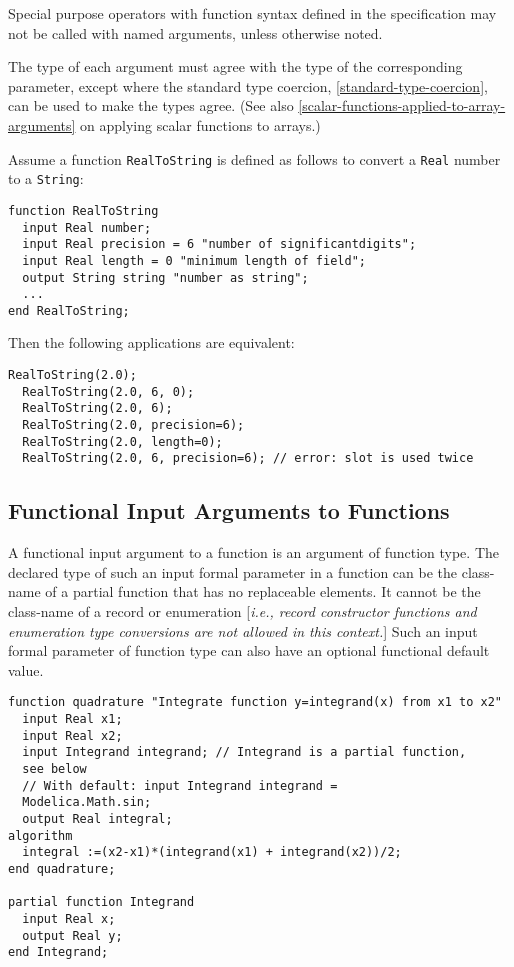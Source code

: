 Special purpose operators with function syntax defined in the
specification may not be called with named arguments, unless otherwise
noted.

The type of each argument must agree with the type of the corresponding
parameter, except where the standard type coercion, \autoref{standard-type-coercion}, can be used to make
the types agree. (See also \autoref{scalar-functions-applied-to-array-arguments} on applying scalar functions
to arrays.)

\begin{example}
Assume a function \lstinline!RealToString! is defined as follows to
convert a \lstinline!Real! number to a \lstinline!String!:
\begin{lstlisting}[language=modelica]
function RealToString
  input Real number;
  input Real precision = 6 "number of significantdigits";
  input Real length = 0 "minimum length of field";
  output String string "number as string";
  ...
end RealToString;
\end{lstlisting}
Then the following applications are equivalent:
\begin{lstlisting}[language=modelica]
  RealToString(2.0);
  RealToString(2.0, 6, 0);
  RealToString(2.0, 6);
  RealToString(2.0, precision=6);
  RealToString(2.0, length=0);
  RealToString(2.0, 6, precision=6); // error: slot is used twice
\end{lstlisting}
\end{example}

\subsection{Functional Input Arguments to Functions}

A functional input argument to a function is an argument of function
type. The declared type of such an input formal parameter in a function
can be the class-name of a partial function that has no replaceable
elements. It cannot be the class-name of a record or enumeration
{[}\emph{i.e., record constructor functions and enumeration type
conversions are not allowed in this context.}{]} Such an input formal
parameter of function type can also have an optional functional default
value.

\begin{example}
\begin{lstlisting}[language=modelica]
  function quadrature "Integrate function y=integrand(x) from x1 to x2"
  input Real x1;
  input Real x2;
  input Integrand integrand; // Integrand is a partial function,
  see below
  // With default: input Integrand integrand =
  Modelica.Math.sin;
  output Real integral;
algorithm
  integral :=(x2-x1)*(integrand(x1) + integrand(x2))/2;
end quadrature;

partial function Integrand
  input Real x;
  output Real y;
end Integrand;
\end{lstlisting}
\end{example}

